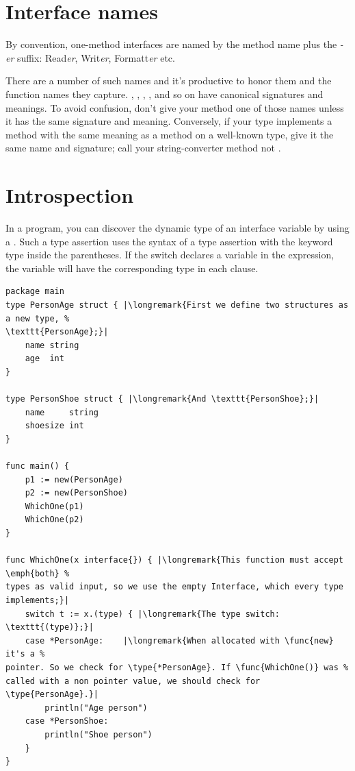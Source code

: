 \section{Interface names}
By convention, one-method interfaces are named by the method name plus
the \emph{-er} suffix: Read\emph{er}, Writ\emph{er}, Formatt\emph{er} etc.

There are a number of such names and it's productive to honor them and
the function names they capture. , ,
, ,  and
so on have canonical signatures and meanings. To avoid confusion, don't
give your method one of those names unless it has the same signature and
meaning. Conversely, if your type implements a method with the same
meaning as a method on a well-known type, give it the same name and
signature; call your string-converter method  not
.

\section{Introspection}
\label{sec:introspection}
In a program, you can discover the dynamic type of an interface variable
by using a .
Such a type assertion uses
the syntax of a type assertion with the keyword type inside the
parentheses. If the switch declares a variable in the expression, the
variable will have the corresponding type in each clause.
\begin{lstlisting}[caption=Dynamically find out the type]
package main
type PersonAge struct { |\longremark{First we define two structures as a new type, %
\texttt{PersonAge};}|
	name string
	age  int
}

type PersonShoe struct { |\longremark{And \texttt{PersonShoe};}|
	name     string
	shoesize int
}

func main() {
	p1 := new(PersonAge)
	p2 := new(PersonShoe)
	WhichOne(p1)
	WhichOne(p2)
}

func WhichOne(x interface{}) { |\longremark{This function must accept \emph{both} %
types as valid input, so we use the empty Interface, which every type implements;}|
	switch t := x.(type) { |\longremark{The type switch: \texttt{(type)};}|
	case *PersonAge:	|\longremark{When allocated with \func{new} it's a %
pointer. So we check for \type{*PersonAge}. If \func{WhichOne()} was %
called with a non pointer value, we should check for \type{PersonAge}.}|
		println("Age person")
	case *PersonShoe:
		println("Shoe person")
	}
}
\end{lstlisting}
\showremarks

